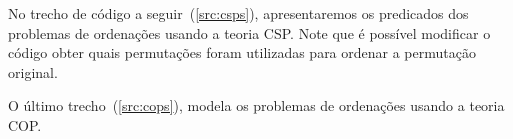 \vspace{1.0cm}



No trecho de código a seguir~(\ref{src:csps}), apresentaremos os
predicados dos problemas de ordenações usando a teoria CSP. Note que é
possível modificar o código obter quais permutações foram utilizadas
para ordenar a permutação original.

\vspace{1.0cm}



O último trecho~(\ref{src:cops}), modela os problemas de ordenações
usando a teoria COP. 

\vspace{1.0cm}



